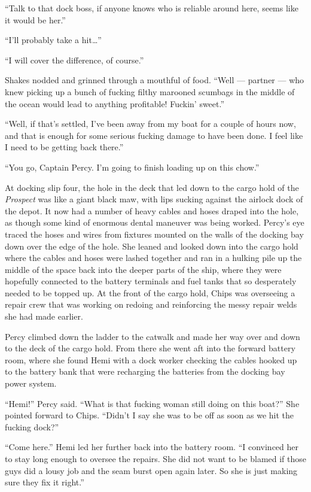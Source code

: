 \documentclass[
]{scrbook}
\begin{document}
``Talk to that dock boss, if anyone knows who is reliable around here,
seems like it would be her.''

``I'll probably take a hit\ldots{}''

``I will cover the difference, of course.''

Shakes nodded and grinned through a mouthful of food. ``Well --- partner
--- who knew picking up a bunch of fucking filthy marooned scumbags in
the middle of the ocean would lead to anything profitable! Fuckin'
sweet.''

``Well, if that's settled, I've been away from my boat for a couple of
hours now, and that is enough for some serious fucking damage to have
been done. I feel like I need to be getting back there.''

``You go, Captain Percy. I'm going to finish loading up on this chow.''

\bigskip

At docking slip four, the hole in the deck that led down to the cargo
hold of the \emph{Prospect} was like a giant black maw, with lips
sucking against the airlock dock of the depot. It now had a number of
heavy cables and hoses draped into the hole, as though some kind of
enormous dental maneuver was being worked. Percy's eye traced the hoses
and wires from fixtures mounted on the walls of the docking bay down
over the edge of the hole. She leaned and looked down into the cargo
hold where the cables and hoses were lashed together and ran in a
hulking pile up the middle of the space back into the deeper parts of
the ship, where they were hopefully connected to the battery terminals
and fuel tanks that so desperately needed to be topped up. At the front
of the cargo hold, Chips was overseeing a repair crew that was working
on redoing and reinforcing the messy repair welds she had made earlier.

Percy climbed down the ladder to the catwalk and made her way over and
down to the deck of the cargo hold. From there she went aft into the
forward battery room, where she found Hemi with a dock worker checking
the cables hooked up to the battery bank that were recharging the
batteries from the docking bay power system.

``Hemi!'' Percy said. ``What is that fucking woman still doing on this
boat?'' She pointed forward to Chips. ``Didn't I say she was to be off
as soon as we hit the fucking dock?''

``Come here.'' Hemi led her further back into the battery room. ``I
convinced her to stay long enough to oversee the repairs. She did not
want to be blamed if those guys did a lousy job and the seam burst open
again later. So she is just making sure they fix it right.''
\end{document}
